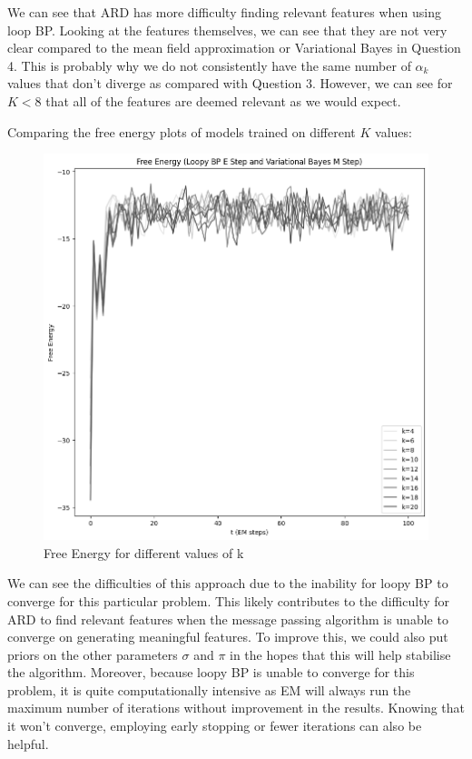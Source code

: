 \documentclass[12pt]{article}
\begin{document}
We can see that ARD has more difficulty finding relevant features when using loop BP.
Looking at the features themselves, we can see that they are not very clear compared to the mean field approximation or Variational Bayes in Question 4.
This is probably why we do not consistently have the same number of $\alpha_k$ values that don't diverge as compared with Question 3.
However, we can see for $K<8$ that all of the features are deemed relevant as we would expect.

\newpage
Comparing the free energy plots of models trained on different $K$ values:

\begin{figure}[h]
\centering
\includegraphics[scale=0.4]{outputs/q5/d-free-energy}
\caption{Free Energy for different values of k}
\label{fig:}
\end{figure}

We can see the difficulties of this approach due to the inability for loopy BP to converge for this particular problem.
This likely contributes to the difficulty for ARD to find relevant features when the message passing algorithm is unable to converge on generating meaningful features.
To improve this, we could also put priors on the other parameters $\sigma$ and $\pi$ in the hopes that this will help stabilise the algorithm.
Moreover, because loopy BP is unable to converge for this problem, it is quite computationally intensive as EM will always run the maximum number of iterations without improvement in the results.
Knowing that it won't converge, employing early stopping or fewer iterations can also be helpful.
\end{document}
